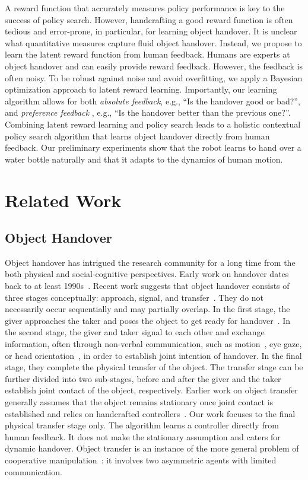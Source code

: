 A reward function that accurately measures policy performance is key to the success of policy search. However, handcrafting a good reward function is often tedious and error-prone, in particular, for learning object handover. It is unclear what quantitative measures capture fluid object handover. Instead, we propose to learn the latent reward function from human feedback.  Humans are experts at object handover and can easily provide reward feedback. However, the feedback is often noisy. To be robust against noise and avoid overfitting, we apply a Bayesian optimization approach to latent reward learning. Importantly, our learning algorithm allows for both \emph{absolute feedback}, e.g., ``Is the handover good or bad?'', and \emph{preference feedback} , e.g., ``Is the handover better than the previous one?''. Combining latent reward learning and policy search leads to a holistic contextual policy search algorithm that learns object handover directly from human feedback. Our preliminary experiments show that the robot learns to hand over a water bottle naturally and that it adapts to the dynamics of human motion. 

\section{Related Work}
\label{sec:related}

\subsection{Object Handover} Object handover has intrigued the research community for a long time from the both physical and social-cognitive perspectives. Early work on handover dates back to at least 1990s~\citep{Agah_ICRA_1997,NagOos98}.  Recent work suggests that object handover consists of three stages conceptually: approach, signal, and transfer~\citep{Strabala_JHRI_2013}.  They do not necessarily occur sequentially and may partially overlap.  In the first stage, the giver approaches the taker and poses the object to get ready for handover~\citep{CakSri11,MaiGha12,SisAla05}. In the second stage, the giver and taker signal to each other and exchange information, often through non-verbal communication, such as motion~\cite{Dragan_RSS_2013}, eye gaze, or head orientation~\citep{Grigore_IROS_2013}, in order to establish joint intention of handover.  In the final stage, they complete the physical transfer of the object. The transfer stage can be further divided into two sub-stages, before and after the giver and the taker establish joint contact of the object, respectively. Earlier work on object transfer generally assumes that the object remains stationary once joint contact is established and relies on handcrafted controllers~\citep{Agah_ICRA_1997,Chan_ICRA_2014,HuaCak15,NagOos98}.  Our work focuses to the final physical transfer stage only. The algorithm learns a controller directly from human feedback. It does not make the stationary assumption and caters for dynamic handover.  Object transfer is an instance of the more general problem of cooperative manipulation~\citep{BruKha08}: it involves two asymmetric agents with limited communication.


